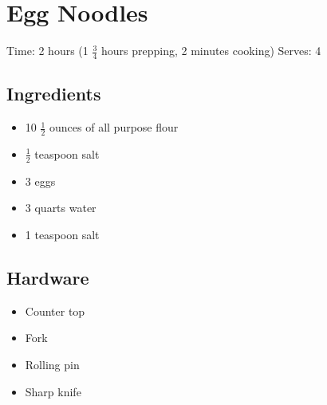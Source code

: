 \section{Egg Noodles}
\label{eggNoodles}
\setcounter{secnumdepth}{0}
Time: 2 hours (1 \( \frac{3}{4} \) hours prepping, 2 minutes cooking)
Serves: 4

\begin{multicols}{2}
\subsection*{Ingredients}
\begin{itemize}
    \item 10 \( \frac{1}{2} \) ounces of all purpose flour
    \item \( \frac{1}{2} \) teaspoon salt
    \item 3 eggs
    \item 3 quarts water
    \item 1 teaspoon salt
\end{itemize}

\subsection*{Hardware}
\begin{itemize}
    \item Counter top
    \item Fork
    \item Rolling pin
    \item Sharp knife
\end{itemize}
\clearpage


\end{multicols}
